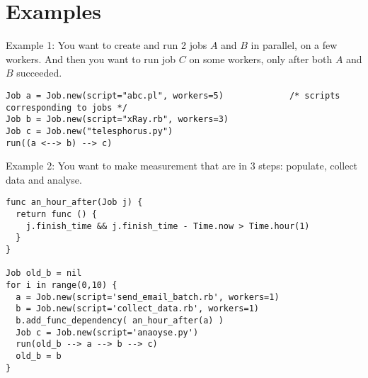 \section{Examples}
\label{sect:ex}
Example 1: You want to create and run 2 jobs $A$ and $B$ in parallel, on a few
workers. And then you want to run job $C$ on some workers, only after both $A$
and $B$ succeeded.
\begin{lstlisting}
Job a = Job.new(script="abc.pl", workers=5)             /* scripts corresponding to jobs */
Job b = Job.new(script="xRay.rb", workers=3)
Job c = Job.new("telesphorus.py")
run((a <--> b) --> c)
\end{lstlisting}
Example 2: You want to make measurement that are in 3 steps: populate, collect
data and analyse.
\begin{lstlisting}
func an_hour_after(Job j) {
  return func () {
    j.finish_time && j.finish_time - Time.now > Time.hour(1)
  }
}

Job old_b = nil
for i in range(0,10) {
  a = Job.new(script='send_email_batch.rb', workers=1)
  b = Job.new(script='collect_data.rb', workers=1)
  b.add_func_dependency( an_hour_after(a) )
  Job c = Job.new(script='anaoyse.py')
  run(old_b --> a --> b --> c)
  old_b = b
}
\end{lstlisting}
